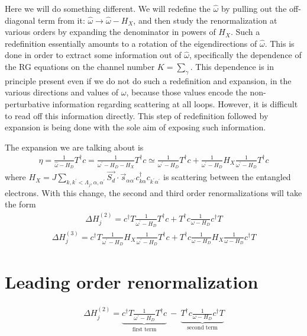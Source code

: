\documentclass{revtex4-2}
\numberwithin{equation}{section}
\begin{document}
Here we will do something different. We will redefine the \(\hat \omega\) by pulling out the off-diagonal term from it: \(\hat \omega \to \hat \omega - H_X\), and then study the renormalization at various orders by expanding the denominator in powers of \(H_X\). Such a redefinition essentially amounts to a rotation of the eigendirections of \(\hat \omega\). This is done in order to extract some information out of \(\hat \omega\), specifically the dependence of the RG equations on the channel number \(K = \sum_\gamma\). This dependence is in principle present even if we do not do such a redefinition and expansion, in the various directions and values of \(\omega\), because those values encode the non-perturbative information regarding scattering at all loops. However, it is difficult to read off this information directly. This step of redefinition followed by expansion is being done with the sole aim of exposing such information. 

The expansion we are talking about is
\begin{equation}\begin{aligned}
	\eta = \frac{1}{\hat \omega - H_D}T^\dagger c = \frac{1}{\omega^\prime - H_D - H_X}T^\dagger c \simeq \frac{1}{\omega^\prime - H_D}T^\dagger c + \frac{1}{\omega^\prime - H_D}H_X \frac{1}{\omega^\prime - H_D} T^\dagger c
\end{aligned}\end{equation}
where \(H_X = J \sum_{k,k^\prime < \Lambda_j, \alpha,\alpha^\prime}\vec{S_d}\cdot\vec{s}_{\alpha \alpha^\prime}c^\dagger_{k\alpha}c_{k^\prime\alpha^\prime}\) is scattering between the entangled electrons.
With this change, the second and third order renormalizations will take the form
\begin{equation}\begin{aligned}
	\Delta H^{(2)}_j = c^\dagger T \frac{1}{\omega^\prime - H_D}T^\dagger c + T^\dagger c \frac{1}{\omega - H_D}c^\dagger T
\end{aligned}\end{equation}
\begin{equation}\begin{aligned}
	\Delta H^{(3)}_j = c^\dagger T \frac{1}{\omega^\prime - H_D} H_X \frac{1}{\omega^\prime - H_D} T^\dagger c + T^\dagger c \frac{1}{\omega - H_D} H_X \frac{1}{\omega - H_D} c^\dagger T
\end{aligned}\end{equation}

\section{Leading order renormalization}
\begin{equation}\begin{aligned}
	\Delta H^{(2)}_j = \underbrace{c^\dagger T \frac{1}{\omega^\prime - H_D}T^\dagger c}_\text{first term}~ -~ \underbrace{T^\dagger c \frac{1}{\omega - H_D}c^\dagger T}_\text{second term}
\end{aligned}\end{equation}
\end{document}
